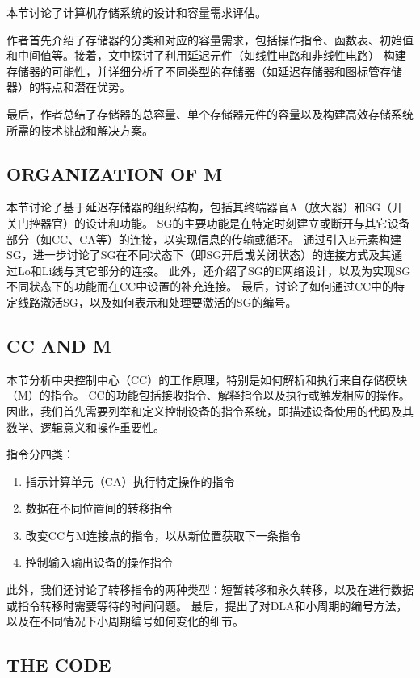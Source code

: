 \documentclass[12pt]{article} %
\theoremstyle{definition}
\begin{document}
本节讨论了计算机存储系统的设计和容量需求评估。

作者首先介绍了存储器的分类和对应的容量需求，包括操作指令、函数表、初始值和中间值等。接着，文中探讨了利用延迟元件（如线性电路和非线性电路）
构建存储器的可能性，并详细分析了不同类型的存储器（如延迟存储器和图标管存储器）的特点和潜在优势。

最后，作者总结了存储器的总容量、单个存储器元件的容量以及构建高效存储系统所需的技术挑战和解决方案。

\subsection{ORGANIZATION OF M}

本节讨论了基于延迟存储器的组织结构，包括其终端器官A（放大器）和SG（开关门控器官）的设计和功能。
SG的主要功能是在特定时刻建立或断开与其它设备部分（如CC、CA等）的连接，以实现信息的传输或循环。
通过引入E元素构建SG，进一步讨论了SG在不同状态下（即SG开启或关闭状态）的连接方式及其通过Lo和Li线与其它部分的连接。
此外，还介绍了SG的E网络设计，以及为实现SG不同状态下的功能而在CC中设置的补充连接。
最后，讨论了如何通过CC中的特定线路激活SG，以及如何表示和处理要激活的SG的编号。

\subsection{CC AND M}

本节分析中央控制中心（CC）的工作原理，特别是如何解析和执行来自存储模块（M）的指令。
CC的功能包括接收指令、解释指令以及执行或触发相应的操作。因此，我们首先需要列举和定义控制设备的指令系统，即描述设备使用的代码及其数学、逻辑意义和操作重要性。

指令分四类：
\begin{enumerate}
  \item 指示计算单元（CA）执行特定操作的指令
  \item 数据在不同位置间的转移指令
  \item 改变CC与M连接点的指令，以从新位置获取下一条指令
  \item 控制输入输出设备的操作指令
\end{enumerate}

此外，我们还讨论了转移指令的两种类型：短暂转移和永久转移，以及在进行数据或指令转移时需要等待的时间问题。
最后，提出了对DLA和小周期的编号方法，以及在不同情况下小周期编号如何变化的细节。

\subsection{THE CODE}
\end{document}

